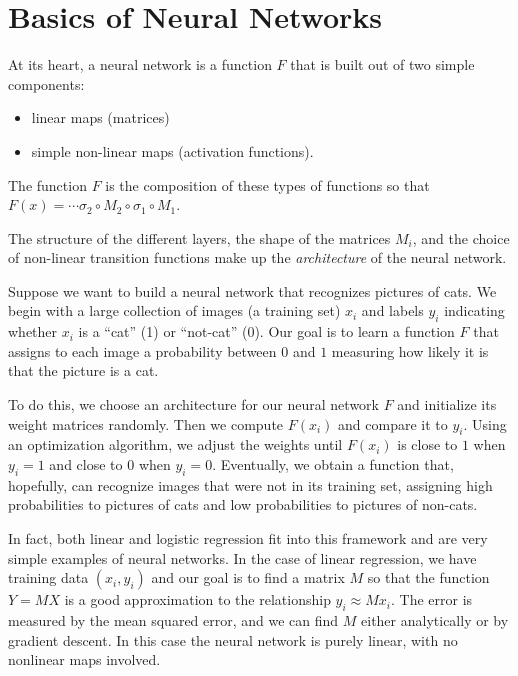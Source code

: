 \documentclass[
  11pt,
  letterpaper,
]{scrbook}
\providecommand{\tightlist}{%
  \setlength{\itemsep}{0pt}\setlength{\parskip}{0pt}}\usepackage{longtable,booktabs,array}
\theoremstyle{plain}
\theoremstyle{remark}
\begin{document}
\hypertarget{basics-of-neural-networks}{%
\section{Basics of Neural Networks}\label{basics-of-neural-networks}}

At its heart, a neural network is a function \(F\) that is built out of
two simple components:

\begin{itemize}
\tightlist
\item
  linear maps (matrices)
\item
  simple non-linear maps (activation functions).
\end{itemize}

The function \(F\) is the composition of these types of functions so
that \(F(x) = \cdots \sigma_2\circ M_2\circ\sigma_1\circ M_1\).

The structure of the different layers, the shape of the matrices
\(M_{i}\), and the choice of non-linear transition functions make up the
\emph{architecture} of the neural network.

Suppose we want to build a neural network that recognizes pictures of
cats. We begin with a large collection of images (a training set)
\(x_i\) and labels \(y_i\) indicating whether \(x_i\) is a ``cat'' (1)
or ``not-cat'' (0). Our goal is to learn a function \(F\) that assigns
to each image a probability between \(0\) and \(1\) measuring how likely
it is that the picture is a cat.

To do this, we choose an architecture for our neural network \(F\) and
initialize its weight matrices randomly. Then we compute \(F(x_i)\) and
compare it to \(y_i\). Using an optimization algorithm, we adjust the
weights until \(F(x_i)\) is close to \(1\) when \(y_i = 1\) and close to
\(0\) when \(y_i = 0\). Eventually, we obtain a function that,
hopefully, can recognize images that were not in its training set,
assigning high probabilities to pictures of cats and low probabilities
to pictures of non-cats.

In fact, both linear and logistic regression fit into this framework and
are very simple examples of neural networks. In the case of linear
regression, we have training data \((x_i,y_i)\) and our goal is to find
a matrix \(M\) so that the function \(Y=MX\) is a good approximation to
the relationship \(y_i\approx Mx_i\). The error is measured by the mean
squared error, and we can find \(M\) either analytically or by gradient
descent. In this case the neural network is purely linear, with no
nonlinear maps involved.
\end{document}
